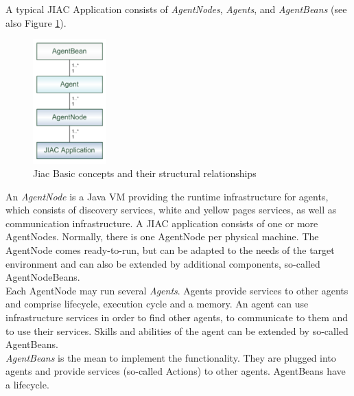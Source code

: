 A typical JIAC Application consists of \textit{AgentNodes}, \textit{Agents}, and \textit{AgentBeans} (see also Figure \ref{fig:jiac_basic}).
\begin{figure}[h]
	\centering
		\includegraphics[width=0.25\textwidth]{images/jiac_basic.png}
		\caption{Jiac Basic concepts and their structural relationships \cite{JIACMAN10}}
	\label{fig:jiac_basic}
\end{figure}
An \textit{AgentNode} is a Java VM providing the runtime infrastructure for agents, which consists of discovery services, white and yellow pages services, as well as communication infrastructure. A
JIAC application consists of one or more AgentNodes. Normally, there is one AgentNode
per physical machine. The AgentNode comes ready-to-run, but can be adapted to the
needs of the target environment and can also be extended by additional components,
so-called AgentNodeBeans.\\
Each AgentNode may run several \textit{Agents}. Agents provide services to other agents
and comprise lifecycle, execution cycle and a memory. An agent can use infrastructure
services in order to find other agents, to communicate to them and to use their services.
Skills and abilities of the agent can be extended by so-called AgentBeans.\\
\textit{AgentBeans} is the mean to implement the functionality. They are plugged into agents
and provide services (so-called Actions) to other agents. AgentBeans have a lifecycle.

